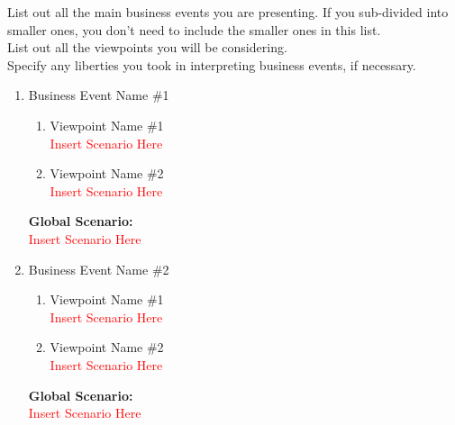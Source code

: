 \documentclass[]{article}
\begin{document}
 List out all the main business events you are presenting. If you sub-divided into smaller ones, you don't need to include the smaller ones in this list.\\

 List out all the viewpoints you will be considering.\\

 Specify any liberties you took in interpreting business events, if necessary.\\

\begin{enumerate}[{\bf BE1.}]
	\item Business Event Name \#1
	      \begin{enumerate}[{\bf VP1.}]
		      \item Viewpoint Name \#1 \\
		            \textcolor{red}{Insert Scenario Here}
		      \item Viewpoint Name \#2 \\
		            \textcolor{red}{Insert Scenario Here}
	      \end{enumerate}
	      {\bf Global Scenario:}\\
	      \textcolor{red}{Insert Scenario Here}
	\item Business Event Name \#2
	      \begin{enumerate}[{\bf VP1.}]
		      \item Viewpoint Name \#1 \\
		            \textcolor{red}{Insert Scenario Here}
		      \item Viewpoint Name \#2 \\
		            \textcolor{red}{Insert Scenario Here}
	      \end{enumerate}
	      {\bf Global Scenario:}\\
	      \textcolor{red}{Insert Scenario Here}
\end{enumerate}
\end{document}
